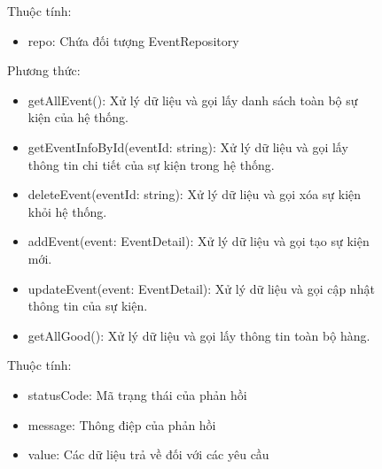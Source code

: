 \begin{figure}[!htp]
Thuộc tính:
\begin{itemize}
	\item repo: Chứa đối tượng EventRepository
\end{itemize}
Phương thức:
\begin{itemize}
	\item getAllEvent(): Xử lý dữ liệu và gọi lấy danh sách toàn bộ sự kiện của hệ thống.
	\item getEventInfoById(eventId: string): Xử lý dữ liệu và gọi lấy thông tin chi tiết của sự kiện trong hệ thống.
	\item deleteEvent(eventId: string): Xử lý dữ liệu và gọi xóa sự kiện khỏi hệ thống.
	\item addEvent(event: EventDetail): Xử lý dữ liệu và gọi tạo sự kiện mới.
	\item updateEvent(event: EventDetail): Xử lý dữ liệu và gọi cập nhật thông tin của sự kiện.
	\item getAllGood(): Xử lý dữ liệu và gọi lấy thông tin toàn bộ hàng.
\end{itemize}

Thuộc tính:
\begin{itemize}
	\item statusCode: Mã trạng thái của phản hồi
	\item message: Thông điệp của phản hồi
	\item value: Các dữ liệu trả về đối với các yêu cầu
\end{itemize}


\end{figure}
